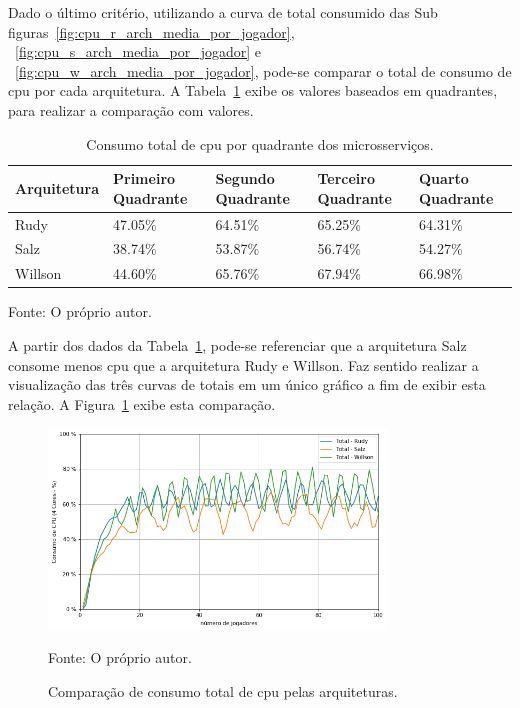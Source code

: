 Dado o último critério, utilizando a curva de total consumido das Sub figuras~\ref{fig:cpu_r_arch_media_por_jogador}, ~\ref{fig:cpu_s_arch_media_por_jogador} e ~\ref{fig:cpu_w_arch_media_por_jogador},  pode-se comparar o total de consumo de \ac{cpu} por cada arquitetura.
%
A Tabela~\ref{tab:consumo_total_cpu} exibe os valores baseados em quadrantes, para realizar a comparação com valores.


\begin{table}[htb!]
\centering
\begin{adjustbox}{max width=\textwidth}
\caption{Consumo total de \ac{cpu} por quadrante dos microsserviços.}
\label{tab:consumo_total_cpu}

\begin{tabular}{|l|l|l|l|l|}
\hline
Arquitetura & Primeiro Quadrante & Segundo Quadrante & Terceiro Quadrante & Quarto Quadrante \\ \hline
Rudy        & 47.05\%            & 64.51\%           & 65.25\%            & 64.31\%          \\ \hline
Salz        & 38.74\%            & 53.87\%           & 56.74\%            & 54.27\%          \\ \hline
Willson     & 44.60\%            & 65.76\%           & 67.94\%            & 66.98\%          \\ \hline
\end{tabular}
\end{adjustbox}

Fonte: O próprio autor.
\end{table}

A partir dos dados da Tabela~\ref{tab:consumo_total_cpu}, pode-se referenciar que a arquitetura Salz consome menos \ac{cpu} que a arquitetura Rudy e Willson.
%
Faz sentido realizar a visualização das três curvas de totais em um único gráfico a fim de exibir esta relação.
%
A Figura~\ref{fig:consumo_total_cpu} exibe esta comparação.

\begin{figure}[htb!]
  \caption{Comparação de consumo total de \ac{cpu} pelas arquiteturas.}
  \label{fig:consumo_total_cpu}
  \includegraphics[width=0.8\textwidth]{figuras/analise/cpu_total_archs.png}
  \centering

  Fonte: O próprio autor.
\end{figure}

